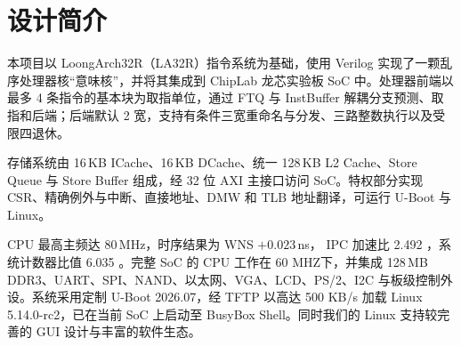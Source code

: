 \section{设计简介}

本项目以 LoongArch32R（LA32R）指令系统为基础，使用 Verilog 实现了一颗乱序处理器核“意味核”，并将其集成到 ChipLab 龙芯实验板 SoC 中。处理器前端以最多 4 条指令的基本块为取指单位，通过 FTQ 与 InstBuffer 解耦分支预测、取指和后端；后端默认 2 宽，支持有条件三宽重命名与分发、三路整数执行以及受限四退休。

存储系统由 16\,KB ICache、16\,KB DCache、统一 128\,KB L2 Cache、Store Queue 与 Store Buffer 组成，经 32 位 AXI 主接口访问 SoC。特权部分实现 CSR、精确例外与中断、直接地址、DMW 和 TLB 地址翻译，可运行 U-Boot 与 Linux。

CPU 最高主频达 80\,MHz，时序结果为 WNS $+0.023$\,ns， IPC 加速比 2.492 ，系统计数器比值 6.035 。完整 SoC 的 CPU 工作在 60 MHZ下，并集成 128\,MB DDR3、UART、SPI、NAND、以太网、VGA、LCD、PS/2、I2C 与板级控制外设。系统采用定制 U-Boot 2026.07，经 TFTP 以高达 500 KB/s 加载 Linux 5.14.0-rc2，已在当前 SoC 上启动至 BusyBox Shell。同时我们的 Linux 支持较完善的 GUI 设计与丰富的软件生态。 
